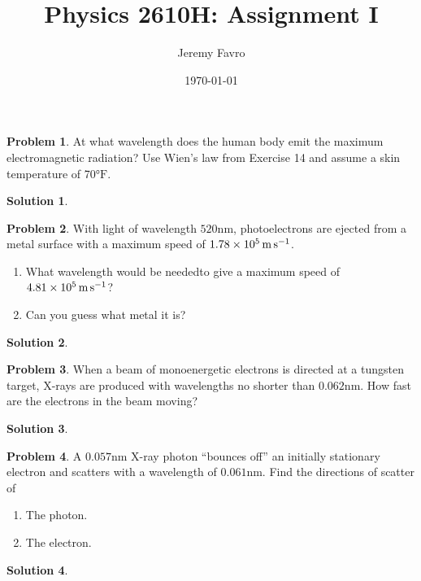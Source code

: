 \documentclass[10pt]{article}
\title{Physics 2610H: Assignment I}
\author{Jeremy Favro}
\date{\today}
\theoremstyle{definition}
\newtheorem{problem}{Problem}
\newtheorem{soln}{Solution}
\begin{document}
\maketitle

\begin{problem}
At what wavelength does the human body emit the maximum electromagnetic radiation? Use Wien's law from Exercise 14 and assume a skin
temperature of 70$\unit{\degree}\mathrm{F}$.
\end{problem}
\begin{soln}
\end{soln}

\begin{problem}
With light of wavelength $520\unit{\nano\meter}$, photoelectrons are ejected from a metal surface with a maximum speed of $\SI{1.78d5}{\meter\per\second}$.
\begin{enumerate}[label=(\alph*)]
  \item What wavelength would be neededto give a maximum speed of $\SI{4.81d5}{\meter\per\second}$?
  \item Can you guess what metal it is?
\end{enumerate}
\end{problem}
\begin{soln}
\end{soln}

\begin{problem}
When a beam of monoenergetic electrons is directed at a tungsten target, X-rays are produced with wavelengths no shorter than
$0.062\unit{\nano\meter}$. How fast are the electrons in the beam moving?
\end{problem}
\begin{soln}
\end{soln}

\begin{problem}
A $0.057\unit{\nano\meter}$ X-ray photon ``bounces off'' an initially stationary electron and scatters with a wavelength of $0.061\unit{\nano\meter}$. Find the directions of scatter of
\begin{enumerate}[label=(\alph*)]
  \item The photon.
  \item The electron.
\end{enumerate}
\end{problem}
\begin{soln}
\end{soln}
\end{document}
